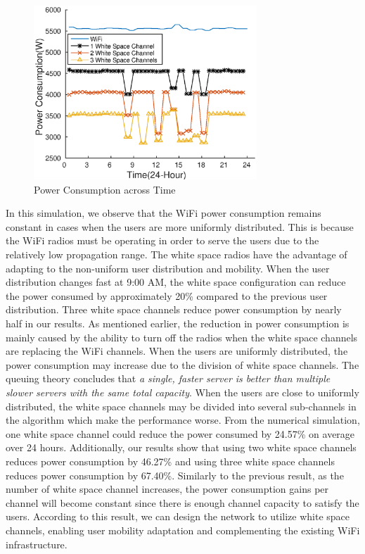 \begin{figure}[hpt]
\vspace{-0.1in}
\centering
\includegraphics[width=84mm]{figures/timevary}
\vspace{-0.1in}
\caption{Power Consumption across Time}
\label{fig:timevary}
\vspace{-0.1in}
\end{figure}

In this simulation, we observe that the WiFi power consumption remains constant in cases when the users are more uniformly distributed. 
This is because the WiFi radios must be operating in order to serve the users due to the relatively low propagation range. 
The white space radios have the advantage of adapting to the non-uniform user distribution and  mobility. 
When the user distribution changes fast at 9:00 AM, the white space configuration can reduce the power consumed by approximately 20\% compared to the previous user distribution. 
Three white space channels reduce power consumption by nearly half in our results. 
As mentioned earlier, the reduction in power consumption is mainly caused by the ability to turn off the radios when the white space channels are replacing the WiFi channels.
When the users are uniformly distributed, the power consumption may increase due to the division of white space channels. 
The queuing theory concludes that {\it a single, faster server is better than multiple slower servers with the same total capacity}. 
When the users are close to uniformly distributed, the white space channels may be divided into several sub-channels in the algorithm which make the performance worse. 
From the numerical simulation, one white space channel could reduce the power consumed by 24.57\% on average over 24 hours. 
Additionally, our results show that using two white space channels reduces power consumption by 46.27\% and using three white space channels reduces power consumption by 67.40\%. 
Similarly to the previous result, as the number of white space channel increases, the power consumption gains per channel will become constant since there is enough channel capacity to satisfy the users.
According to this result, we can design the network to utilize white space channels, enabling user mobility adaptation and complementing the existing WiFi infrastructure.



